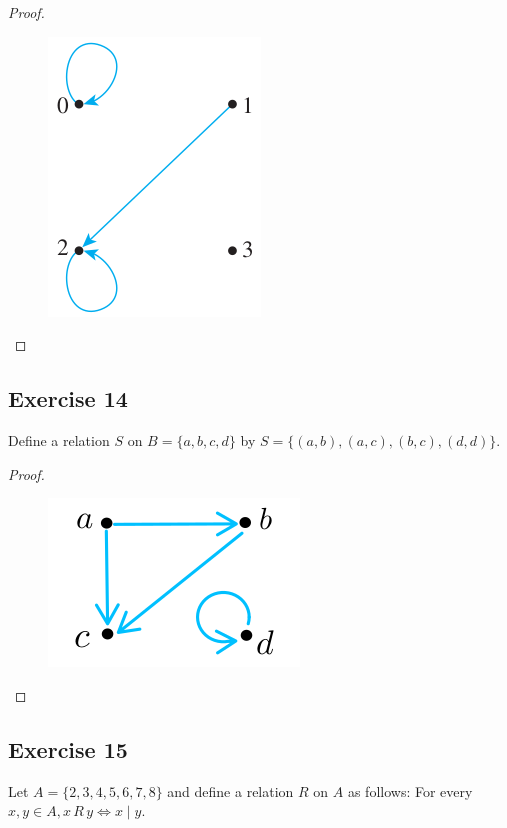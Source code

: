 \documentclass[14pt]{extarticle}
\begin{document}
\begin{proof}
\begin{figure}[ht!]
\centering
\includegraphics[scale=0.4]{../images/8.1.13.png}
\end{figure}
\end{proof}

\subsection{Exercise 14}
Define a relation $S$ on \(B = \{a, b, c, d\}\) by \(S = \{(a, b), (a, c), (b, c), (d, d)\}\).

\begin{proof}
\begin{figure}[ht!]
\centering
\includegraphics[scale=0.4]{../images/8.1.14.png}
\end{figure}
\end{proof}

\subsection{Exercise 15}
Let \(A = \{2, 3, 4, 5, 6, 7, 8\}\) and define a relation $R$ on $A$ as follows: For every \(x, y \in A, x \, R\, y 
\iff x \mid y\).
\end{document}
